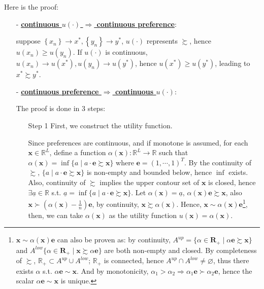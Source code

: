 Here is the proof:
\begin{enumerate}
    \item[-] \underline{\textbf{continuous $u(\cdot)$ $\Rightarrow$ continuous preference}}: 
    
    suppose $\left\{x_n\right\}\rightarrow x^*,\left\{y_n\right\}\rightarrow y^*$, $u(\cdot)$ represents $\succsim$, hence $u(x_n)\geq u(y_n)$. If $u(\cdot)$ is continuous, $u(x_n)\rightarrow u(x^*),u(y_n)\rightarrow u(y^*)$, hence $u(x^*)\geq u(y^*)$, leading to $x^*\succsim y^*$.
    \item[-] \underline{\textbf{continuous preference $\Rightarrow$ continuous $u(\cdot)$}}: 
    
    The proof is done in 3 steps:
    \begin{enumerate}
        \item[Step 1] First, we construct the utility function.
        
        Since preferences are continuous, and if monotone is assumed, for each $\mathbf{x}\in \mathbb{R}^L$, define a function $\alpha(\mathbf{x}):\mathbb{R}^L\rightarrow \mathbb{R}$ such that $\alpha(\mathbf{x})=\inf\{a\mid a\cdot \mathbf{e}\succsim \mathbf{x}\}$ where $\mathbf{e}=(1,\cdots,1)^T$. By the continuity of $\succsim$, $\{a\mid a\cdot \mathbf{e}\succsim \mathbf{x}\}$ is non-empty and bounded below, hence $\inf$ exists.
        Also, continuity of $\succsim$ implies the upper contour set of $\mathbf{x}$ is closed, hence $\exists \underline{a}\in \mathbb{R}$ s.t. $\underline{a}=\inf\{a\mid a\cdot \mathbf{e}\succsim \mathbf{x}\}$. Let $\alpha(\mathbf{x})=\underline{a}$, $\alpha(\mathbf{x})\mathbf{e}\succsim \mathbf{x}$, also $\mathbf{x}\succ (\alpha(\mathbf{x})-\frac{1}{n})\mathbf{e}$, by continuity, $\mathbf{x}\succsim \alpha(\mathbf{x})$. Hence, $\mathbf{x}\sim \alpha(\mathbf{x})\mathbf{e}$\footnote{
            $\mathbf{x}\sim \alpha(\mathbf{x})\mathbf{e}$ can also be proven as: by continuity, $A^{up}=\{\alpha\in \mathbf{R}_+\mid \alpha\mathbf{e}\succsim \mathbf{x}\}$ and $A^{low}\{\alpha\in \mathbf{R}_+\mid \mathbf{x}\succsim\alpha\mathbf{e}\}$ are both non-empty and closed. By completeness of $\succsim$, $\mathbb{R}_+\subset A^{up}\cup A^{low}$; $\mathbb{R}_+$ is connected, hence $A^{up}\cap A^{low}\neq \varnothing$, thus there exists $\alpha$ s.t. $\alpha \mathbf{e}\sim \mathbf{x}$. And by monotonicity, $\alpha_1>\alpha_2\Rightarrow\alpha_1\mathbf{e}\succ \alpha_2\mathbf{e}$, hence the scalar $\alpha\mathbf{e}\sim\mathbf{x}$ is unique.
            }, then, we can take $\alpha(\mathbf{x})$ as the utility function $u(\mathbf{x})=\alpha(\mathbf{x})$.


\end{enumerate}
\end{enumerate}
